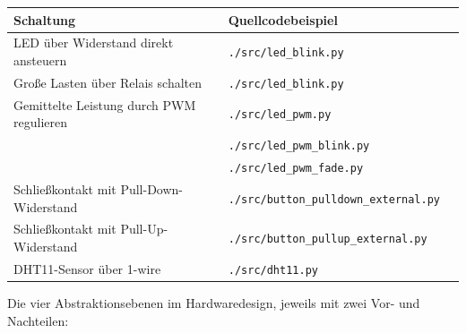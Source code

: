 \begin{tabularx}{\textwidth}{|X|X|X|}
    \hline
    \textbf{Schaltung} & \textbf{Quellcodebeispiel} \\

    \hline
    LED über Widerstand direkt ansteuern &
    \verb|./src/led_blink.py| \\

    \hline
    Große Lasten über Relais schalten &
    \verb|./src/led_blink.py| \\

    \hline
    Gemittelte Leistung durch PWM regulieren &
    \verb|./src/led_pwm.py| \\
    &
    \verb|./src/led_pwm_blink.py| \\
    &
    \verb|./src/led_pwm_fade.py| \\

    \hline
    Schließkontakt mit Pull-Down-Widerstand &
    \verb|./src/button_pulldown_external.py| \\

    \hline
    Schließkontakt mit Pull-Up-Widerstand &
    \verb|./src/button_pullup_external.py| \\

    \hline
    DHT11-Sensor über 1-wire &
    \verb|./src/dht11.py| \\

    \hline
\end{tabularx}


\clearpage
\LoesungHeader

\teilaufgabe
Die vier Abstraktionsebenen im Hardwaredesign, jeweils mit zwei Vor- und
Nachteilen:

